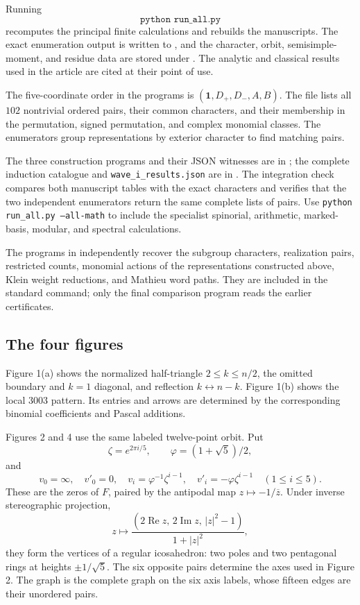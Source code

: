 \documentclass[11pt,a4paper]{article}
\begin{document}
Running
\[
\texttt{python run\_all.py}
\]
recomputes the principal finite calculations and rebuilds the manuscripts. The exact enumeration output is written to , and the character, orbit, semisimple-moment, and residue data are stored under . The analytic and classical results used in the article are cited at their point of use.

The five-coordinate order in the programs is $(\mathbf1,D_+,D_-,A,B)$. The file  lists all $102$ nontrivial ordered pairs, their common characters, and their membership in the permutation, signed permutation, and complex monomial classes. The enumerators group representations by exterior character to find matching pairs.

The three construction programs and their JSON witnesses are in
; the complete induction catalogue and
\texttt{wave\_i\_results.json} are in .
The integration check compares both manuscript tables with the exact
characters and verifies that the two independent enumerators return the
same complete lists of pairs. Use \texttt{python run\_all.py --all-math}
to include the specialist spinorial, arithmetic, marked-basis, modular,
and spectral calculations.

The programs in  independently recover
the subgroup characters, realization pairs, restricted counts, monomial actions of the representations constructed above, Klein weight reductions, and Mathieu word paths. They
are included in the standard command; only the final comparison program
reads the earlier certificates.

\subsection{The four figures}\label{subsec:I2}

Figure 1(a) shows the normalized half-triangle $2\leq k\leq n/2$, the omitted boundary and $k=1$ diagonal, and reflection $k\leftrightarrow n-k$. Figure 1(b) shows the local $3003$ pattern. Its entries and arrows are determined by the corresponding binomial coefficients and Pascal additions.

Figures 2 and 4 use the same labeled twelve-point orbit. Put
\[
\zeta=e^{2\pi i/5},\qquad \varphi=(1+\sqrt5)/2,
\]
and
\[
v_0=\infty,\quad v'_0=0,\quad
v_i=\varphi^{-1}\zeta^{i-1},\quad
v'_i=-\varphi\zeta^{i-1}\quad(1\leq i\leq5).
\]
These are the zeros of \(F\), paired by the antipodal map \(z\mapsto-1/\overline z\). Under inverse stereographic projection,
\[
z\longmapsto
\frac{(2\operatorname{Re}z,\,2\operatorname{Im}z,\,|z|^2-1)}
     {1+|z|^2},
\]
they form the vertices of a regular icosahedron: two poles and two pentagonal rings at heights \(\pm1/\sqrt5\). The six opposite pairs determine the axes used in Figure 2. The graph is the complete graph on the six axis labels, whose fifteen edges are their unordered pairs.
\end{document}

